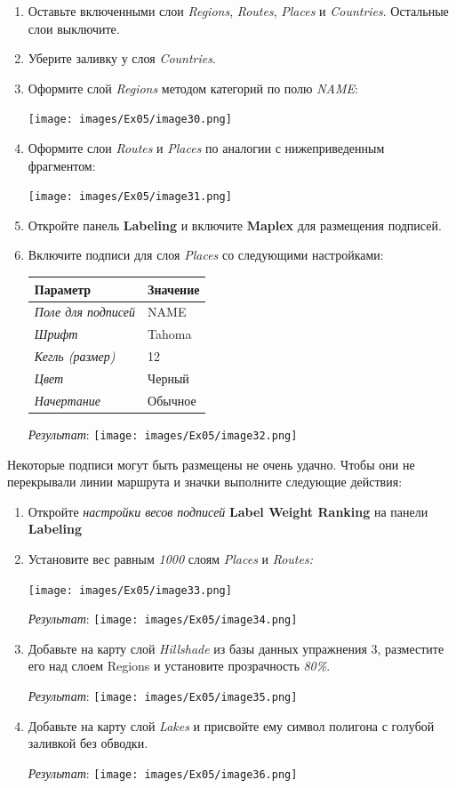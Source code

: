 \documentclass[12pt,]{book}
\begin{document}
\begin{enumerate}
\def\labelenumi{\arabic{enumi}.}
\item
  Оставьте включенными слои \emph{Regions}, \emph{Routes}, \emph{Places} и \emph{Countries}. Остальные слои выключите.
\item
  Уберите заливку у слоя \emph{Countries}.
\item
  Оформите слой \emph{Regions} методом категорий по полю \emph{NAME}:

  \texttt{[image: images/Ex05/image30.png]}
\item
  Оформите слои \emph{Routes} и \emph{Places} по аналогии с нижеприведенным фрагментом:

  \texttt{[image: images/Ex05/image31.png]}
\item
  Откройте панель \textbf{Labeling} и включите \textbf{Maplex} для размещения подписей.
\item
  Включите подписи для слоя \emph{Places} со следующими настройками:

  \begin{longtable}[]{@{}ll@{}}
  \toprule
  Параметр & Значение\tabularnewline
  \midrule
  \endhead
  \emph{Поле для подписей} & NAME\tabularnewline
  \emph{Шрифт} & Tahoma\tabularnewline
  \emph{Кегль (размер)} & 12\tabularnewline
  \emph{Цвет} & Черный\tabularnewline
  \emph{Начертание} & Обычное\tabularnewline
  \bottomrule
  \end{longtable}

  \emph{Результат}:
  \texttt{[image: images/Ex05/image32.png]}
\end{enumerate}

Некоторые подписи могут быть размещены не очень удачно. Чтобы они не перекрывали линии маршрута и значки выполните следующие действия:

\begin{enumerate}
\def\labelenumi{\arabic{enumi}.}
\item
  Откройте \emph{настройки весов подписей} \textbf{Label Weight Ranking} на панели \textbf{Labeling}
\item
  Установите вес равным \emph{1000} слоям \emph{Places} и \emph{Routes:}

  \texttt{[image: images/Ex05/image33.png]}

  \emph{Результат}:
  \texttt{[image: images/Ex05/image34.png]}
\item
  Добавьте на карту слой \emph{Hillshade} из базы данных упражнения 3, разместите его над слоем Regions и установите прозрачность \emph{80\%}.

  \emph{Результат}:
  \texttt{[image: images/Ex05/image35.png]}
\item
  Добавьте на карту слой \emph{Lakes} и присвойте ему символ полигона с голубой заливкой без обводки.

  \emph{Результат}:
  \texttt{[image: images/Ex05/image36.png]}
\end{enumerate}
\end{document}
